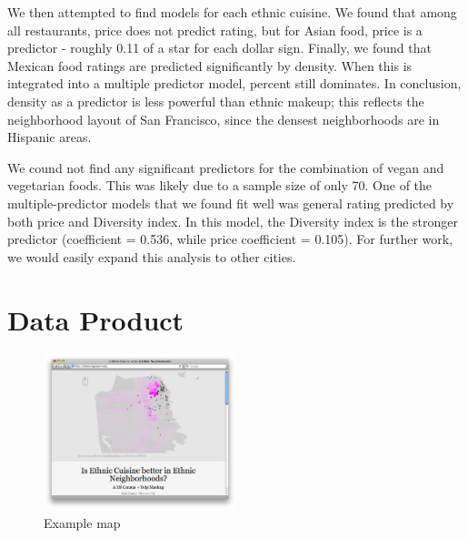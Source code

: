 \documentclass[11pt,twocolumn]{article}
\begin{document}
We then attempted to find models for each ethnic cuisine. We found that among all restaurants, price does not predict rating, but for Asian food, price is a predictor - roughly 0.11 of a star for each dollar sign. Finally, we found that Mexican food ratings are predicted significantly by density. When this is integrated into a multiple predictor model, percent still dominates. In conclusion, density as a predictor is less powerful than ethnic makeup; this reflects the neighborhood layout of San Francisco, since the densest neighborhoods are in Hispanic areas.

We cound not find any significant predictors for the combination of vegan and vegetarian foods. This was likely due to a sample size of only 70. One of the multiple-predictor models that we found fit well was general rating predicted by both price and Diversity index. In this model, the Diversity index is the stronger predictor (coefficient = 0.536, while price coefficient = 0.105). For further work, we would easily expand this analysis to other cities.

\section{Data Product}

\begin{figure}[h!]
  \caption{Example map}
  \centering
  \includegraphics[width=0.5\textwidth]{webapp_screen}
\end{figure}
\end{document}
